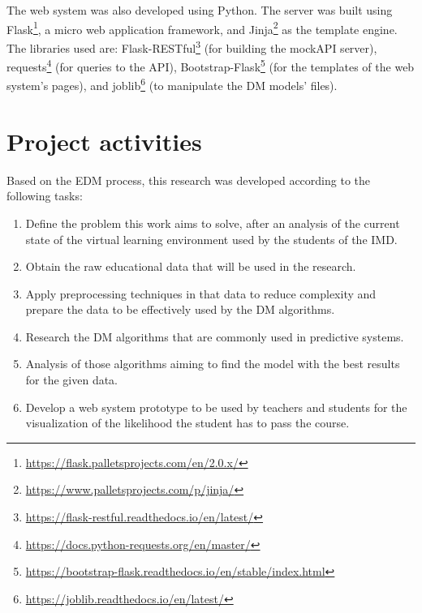 The web system was also developed using Python. The server was built using Flask\footnote[8]{\hspace{1mm}\url{https://flask.palletsprojects.com/en/2.0.x/}}, a micro web application framework, and Jinja\footnote[9]{\hspace{1mm}\url{https://www.palletsprojects.com/p/jinja/}} as the template engine. The libraries used are: Flask-RESTful\footnote[10]{\hspace{1mm}\url{https://flask-restful.readthedocs.io/en/latest/}} (for building the mockAPI server), requests\footnote[11]{\hspace{1mm}\url{https://docs.python-requests.org/en/master/}} (for queries to the API), Bootstrap-Flask\footnote[12]{\hspace{1mm}\url{https://bootstrap-flask.readthedocs.io/en/stable/index.html}} (for the templates of the web system's pages), and joblib\footnote[13]{\hspace{1mm}\url{https://joblib.readthedocs.io/en/latest/}} (to manipulate the DM models' files).

\section{Project activities}

Based on the EDM process, this research was developed according to the following tasks:

\begin{enumerate}
    \item Define the problem this work aims to solve, after an analysis of the current state of the virtual learning environment used by the students of the IMD.
    \item Obtain the raw educational data that will be used in the research.
    \item Apply preprocessing techniques in that data to reduce complexity and prepare the data to be effectively used by the DM algorithms.
    \item Research the DM algorithms that are commonly used in predictive systems.
    \item Analysis of those algorithms aiming to find the model with the best results for the given data.
    \item Develop a web system prototype to be used by teachers and students for the visualization of the likelihood the student has to pass the course.
\end{enumerate}